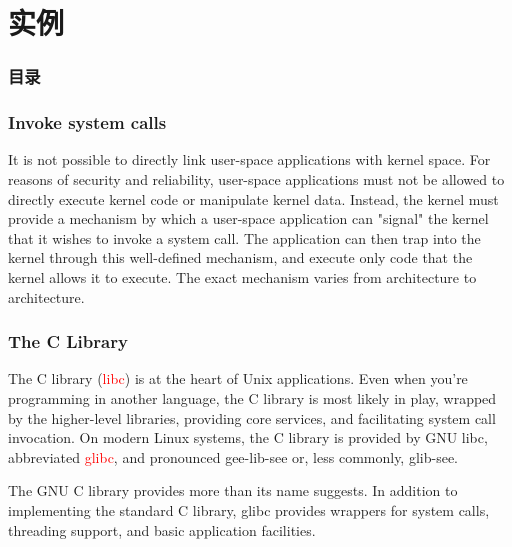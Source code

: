 \documentclass{beamer}
\begin{document}
\section{实例}
\begin{frame}
\frametitle{目录}
\end{frame}
\begin{frame}
\frametitle{Invoke system calls}
It is not possible to directly link user-space applications with kernel space. For reasons of security and reliability, user-space applications must not be allowed to directly execute kernel code or manipulate kernel data. Instead, the kernel must provide a mechanism by which a user-space application can "signal" the kernel that it wishes to invoke a system call. The application can then trap into the kernel through this well-defined mechanism, and execute only code that the kernel allows it to execute. The exact mechanism varies from architecture to architecture.
\end{frame}


\begin{frame}
\frametitle{The C Library}
The C library (\textcolor{red}{libc}) is at the heart of Unix applications. Even when you're programming in another language, the C library is most likely in play, wrapped by the higher-level libraries, providing core services, and facilitating system call invocation. On modern Linux systems, the C library is provided by GNU libc, abbreviated \textcolor{red}{glibc}, and pronounced gee-lib-see or, less commonly, glib-see.

The GNU C library provides more than its name suggests. In addition to implementing the standard C library, glibc provides wrappers for system calls, threading support, and basic application facilities.
\end{frame}
\end{document}
